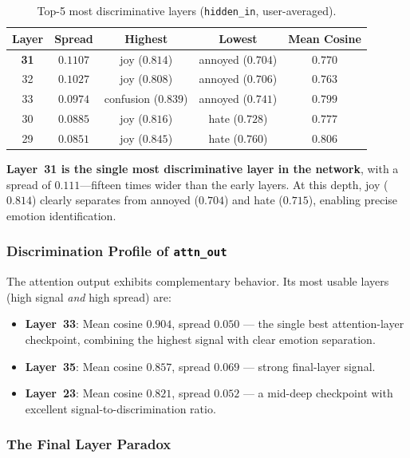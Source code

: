 \documentclass[11pt,a4paper]{article}
\begin{document}
\begin{table}[H]
\centering
\caption{Top-5 most discriminative layers (\texttt{hidden\_in}, user-averaged).}
\label{tab:top_layers}
\small
\begin{tabular}{@{}ccccc@{}}
\toprule
Layer & Spread & Highest & Lowest & Mean Cosine \\
\midrule
\textbf{31} & $\mathbf{0.1107}$ & joy ($0.814$) & annoyed ($0.704$) & $0.770$ \\
32 & $0.1027$ & joy ($0.808$) & annoyed ($0.706$) & $0.763$ \\
33 & $0.0974$ & confusion ($0.839$) & annoyed ($0.741$) & $0.799$ \\
30 & $0.0885$ & joy ($0.816$) & hate ($0.728$) & $0.777$ \\
29 & $0.0851$ & joy ($0.845$) & hate ($0.760$) & $0.806$ \\
\bottomrule
\end{tabular}
\end{table}

\textbf{Layer~31 is the single most discriminative layer in the network}, with a spread of $0.111$---fifteen times wider than the early layers. At this depth, joy ($0.814$) clearly separates from annoyed ($0.704$) and hate ($0.715$), enabling precise emotion identification.

\subsubsection{Discrimination Profile of \texttt{attn\_out}}

The attention output exhibits complementary behavior. Its most usable layers (high signal \emph{and} high spread) are:

\begin{itemize}[leftmargin=*]
  \item \textbf{Layer~33}: Mean cosine $0.904$, spread $0.050$ --- the single best attention-layer checkpoint, combining the highest signal with clear emotion separation.
  \item \textbf{Layer~35}: Mean cosine $0.857$, spread $0.069$ --- strong final-layer signal.
  \item \textbf{Layer~23}: Mean cosine $0.821$, spread $0.052$ --- a mid-deep checkpoint with excellent signal-to-discrimination ratio.
\end{itemize}

\subsubsection{The Final Layer Paradox}
\end{document}
